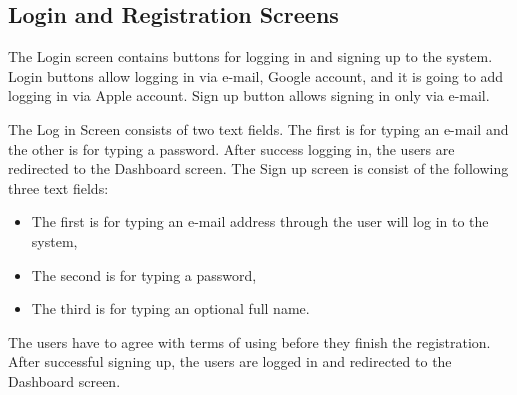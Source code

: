 \subsection{Login and Registration Screens}\label{subsec:login-screen}
The Login screen contains buttons for logging in and signing up to the system.
Login buttons allow logging in via e-mail, Google account, and it is going to add logging in via Apple account.
Sign up button allows signing in only via e-mail.

The Log in Screen consists of two text fields.
The first is for typing an e-mail and the other is for typing a password.
After success logging in, the users are redirected to the Dashboard screen.
\newpage
The Sign up screen is consist of the following three text fields:
\begin{itemize}
    \item The first is for typing an e-mail address through the user will log in to the system,
    \item The second is for typing a password,
    \item The third is for typing an optional full name.
\end{itemize}
The users have to agree with terms of using before they finish the registration.
After successful signing up, the users are logged in and redirected to the Dashboard screen.
